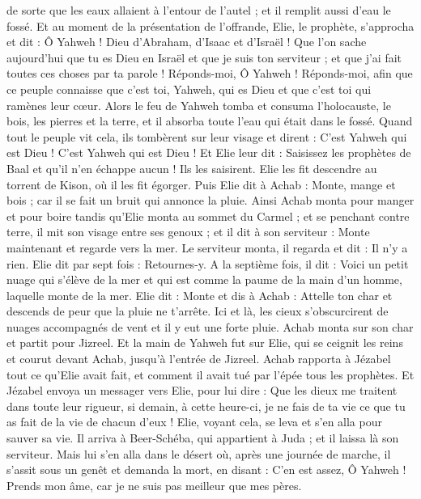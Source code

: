 \begin{multicols}{2}
de sorte que les eaux allaient à l'entour de l'autel ; et il remplit aussi d'eau le fossé.
Et au moment de la présentation de l'offrande, Elie, le prophète, s'approcha et dit : Ô Yahweh ! Dieu d'Abraham, d'Isaac et d'Israël ! Que l'on sache aujourd'hui que tu es Dieu en Israël et que je suis ton serviteur ; et que j'ai fait toutes ces choses par ta parole !
Réponds-moi, Ô Yahweh ! Réponds-moi, afin que ce peuple connaisse que c'est toi, Yahweh, qui es Dieu et que c'est toi qui ramènes leur cœur.
Alors le feu de Yahweh tomba et consuma l'holocauste, le bois, les pierres et la terre, et il absorba toute l'eau qui était dans le fossé.
Quand tout le peuple vit cela, ils tombèrent sur leur visage et dirent : C'est Yahweh qui est Dieu ! C'est Yahweh qui est Dieu !
Et Elie leur dit : Saisissez les prophètes de Baal et qu'il n'en échappe aucun ! Ils les saisirent. Elie les fit descendre au torrent de Kison, où il les fit égorger.
Puis Elie dit à Achab : Monte, mange et bois ; car il se fait un bruit qui annonce la pluie.
Ainsi Achab monta pour manger et pour boire tandis qu'Elie monta au sommet du Carmel ; et se penchant contre terre, il mit son visage entre ses genoux ;
et il dit à son serviteur : Monte maintenant et regarde vers la mer. Le serviteur monta, il regarda et dit : Il n'y a rien. Elie dit par sept fois : Retournes-y.
A la septième fois, il dit : Voici un petit nuage qui s'élève de la mer et qui est comme la paume de la main d'un homme, laquelle monte de la mer. Elie dit : Monte et dis à Achab : Attelle ton char et descends de peur que la pluie ne t'arrête.
Ici et là, les cieux s'obscurcirent de nuages accompagnés de vent et il y eut une forte pluie. Achab monta sur son char et partit pour Jizreel.
Et la main de Yahweh fut sur Elie, qui se ceignit les reins et courut devant Achab, jusqu'à l'entrée de Jizreel.
\VerseOne{}Achab rapporta à Jézabel tout ce qu'Elie avait fait, et comment il avait tué par l'épée tous les prophètes.
Et Jézabel envoya un messager vers Elie, pour lui dire : Que les dieux me traitent dans toute leur rigueur, si demain, à cette heure-ci, je ne fais de ta vie ce que tu as fait de la vie de chacun d'eux !
Elie, voyant cela, se leva et s'en alla pour sauver sa vie. Il arriva à Beer-Schéba, qui appartient à Juda ; et il laissa là son serviteur.
Mais lui s'en alla dans le désert où, après une journée de marche, il s'assit sous un genêt et demanda la mort, en disant : C'en est assez, Ô Yahweh ! Prends mon âme, car je ne suis pas meilleur que mes pères.

\end{multicols}
